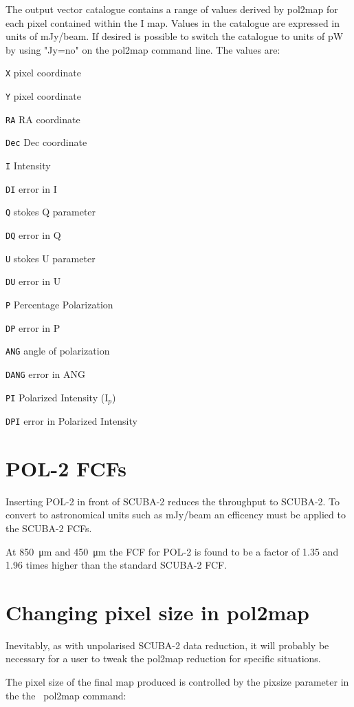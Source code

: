 The output vector catalogue contains a range of values derived by
pol2map for each pixel contained within the I map. Values in the
catalogue are expressed in units of mJy/beam.  If desired is possible
to switch the catalogue to units of pW by using "Jy=no" on the pol2map
command line.  The values are:

\begin{aligndesc}
\item[\texttt{X}] pixel coordinate
\item[\texttt{Y}] pixel coordinate
\item[\texttt{RA}] RA coordinate
\item[\texttt{Dec}] Dec coordinate
\item[\texttt{I}] Intensity
\item[\texttt{DI}] error in I
\item[\texttt{Q}] stokes Q parameter
\item[\texttt{DQ}] error in Q
\item[\texttt{U}] stokes U parameter
\item[\texttt{DU}] error in U
\item[\texttt{P}] Percentage Polarization
\item[\texttt{DP}] error in P
\item[\texttt{ANG}] angle of polarization
\item[\texttt{DANG}] error in ANG
\item[\texttt{PI}] Polarized Intensity (I$_{p}$)
\item[\texttt{DPI}] error in Polarized Intensity
\end{aligndesc}


\section{POL-2 FCFs}
\label{sec:pol2map-fcf}

Inserting POL-2 in front of SCUBA-2 reduces the throughput to SCUBA-2.
To convert to astronomical units such as mJy/beam an efficency must be
applied to the SCUBA-2 FCFs.

At \SI{850}{\micro\metre} and \SI{450}{\micro\metre} the FCF for POL-2
is found to be a factor of 1.35 and 1.96 times higher than the
standard SCUBA-2 FCF.


\section{Changing pixel size in pol2map}
\label{sec:pol2map-pixelsize}

Inevitably, as with unpolarised SCUBA-2 data reduction, it will
probably be necessary for a user to tweak the pol2map reduction for
specific situations.

The pixel size of the final map produced is controlled by the pixsize
parameter in the the \smurf\ pol2map command:

\begin{terminalv}
\end{terminalv}








